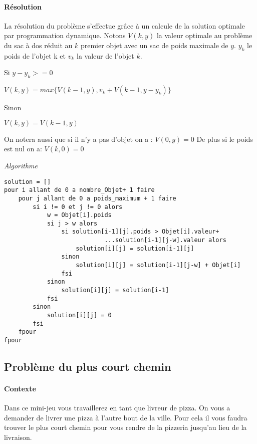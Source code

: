         \paragraph{Résolution}
            La résolution du problème s'effectue grâce à un calcule de la solution optimale
            par programmation dynamique. Notons $V(k,y)$ la valeur optimale au problème du sac à dos
            réduit au $k$ premier objet avec un sac de poids maximale de $y$.
            $y_{k}$ le poids de l'objet k et $v_{k}$ la valeur de l'objet $k$.

            Si $ y - y_{k} >= 0 $

                $V(k,y) = max\{ V(k-1,y)  ,v_{k} + V(k-1,y-y_{k}) \}$

            Sinon

                $V(k,y) = V(k-1,y)$

            On notera aussi que si il n'y a pas d'objet on a : $V(0,y) = 0$
            De plus si le poids est nul on a: $V(k,0) = 0$

	\emph{Algorithme}

\begin{lstlisting}
solution = []
pour i allant de 0 a nombre_Objet+ 1 faire
    pour j allant de 0 a poids_maximum + 1 faire
        si i != 0 et j != 0 alors
            w = Objet[i].poids
            si j > w alors
                si solution[i-1][j].poids > Objet[i].valeur+
                            ...solution[i-1][j-w].valeur alors
                    solution[i][j] = solution[i-1][j]
                sinon
                    solution[i][j] = solution[i-1][j-w] + Objet[i]
                fsi    
            sinon 
                solution[i][j] = solution[i-1]
            fsi
        sinon 
            solution[i][j] = 0
        fsi
    fpour
fpour
\end{lstlisting}


\subsection{Problème du plus court chemin}

        \paragraph{Contexte}
	    Dans ce mini-jeu vous travaillerez en tant que livreur de pizza. On vous a demander de 			livrer  une pizza à l'autre bout de la ville. Pour cela il vous faudra trouver le plus court chemin 
	    pour vous rendre de la pizzeria jusqu'au lieu de la livraison.
